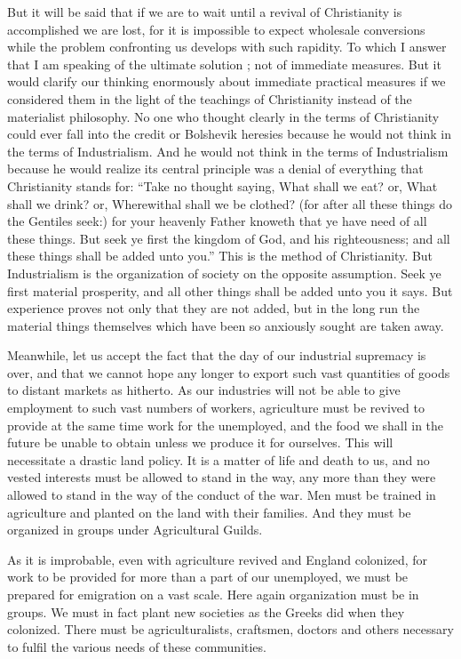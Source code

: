 \documentclass{book}
\begin{document}
But it will be said that if we are to wait until a revival of Christianity is accomplished we are lost, for it is impossible to expect wholesale conversions while the problem confronting us develops with such rapidity. To which I answer that I am speaking of the ultimate solution ; not of immediate measures. But it would clarify our thinking enormously about immediate practical measures if we considered them in the light of the teachings of Christianity instead of the materialist philosophy. No one who thought clearly in the terms of Christianity could ever fall into the credit or Bolshevik heresies because he would not think in the terms of Industrialism. And he would not think in the terms of Industrialism because he would realize its central principle was a denial of everything that Christianity stands for: “Take no thought saying, What shall we eat? or, What shall we drink? or, Wherewithal shall we be clothed? (for after all these things do the Gentiles seek:) for your heavenly Father knoweth that ye have need of all these things. But seek ye first the kingdom of God, and his righteousness; and all these things shall be added unto you.” This is the method of Christianity. But Industrialism is the organization of society on the opposite assumption. Seek ye first material prosperity, and all other things shall be added unto you it says. But experience proves not only that they are not added, but in the long run the material things themselves which have been so anxiously sought are taken away.

Meanwhile, let us accept the fact that the day of our industrial supremacy is over, and that we cannot hope any longer to export such vast quantities of goods to distant markets as hitherto. As our industries will not be able to give employment to such vast numbers of workers, agriculture must be revived to provide at the same time work for the unemployed, and the food we shall in the future be unable to obtain unless we produce it for ourselves. This will necessitate a drastic land policy. It is a matter of life and death to us, and no vested interests must be allowed to stand in the way, any more than they were allowed to stand in the way of the conduct of the war. Men must be trained in agriculture and planted on the land with their families. And they must be organized in groups under Agricultural Guilds.

As it is improbable, even with agriculture revived and England colonized, for work to be provided for more than a part of our unemployed, we must be prepared for emigration on a vast scale. Here again organization must be in groups. We must in fact plant new societies as the Greeks did when they colonized. There must be agriculturalists, craftsmen, doctors and others necessary to fulfil the various needs of these communities.
\end{document}
